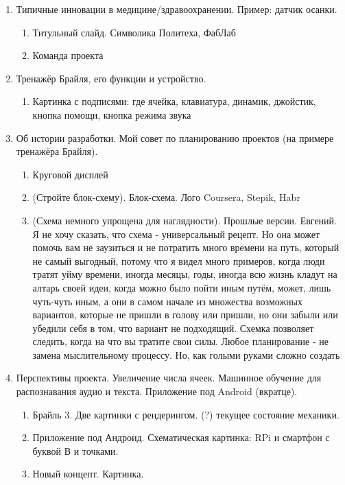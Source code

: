 \documentclass[a4paper,12pt]{article} %
\begin{document}
\begin{enumerate}
	
	\item{} Типичные инновации в медицине/здравоохранении. Пример: датчик осанки.
	\begin{enumerate}
		\item Титульный слайд. Символика Политеха, ФабЛаб
		\item Команда проекта
	\end{enumerate}

	\item{} Тренажёр Брайля, его функции и устройство.
	\begin{enumerate}
		\item Картинка с подписями: где ячейка, клавиатура, динамик, джойстик, кнопка помощи, кнопка режима звука
	\end{enumerate}
	
	\item{} Об истории разработки. Мой совет по планированию проектов (на примере тренажёра Брайля).
	\begin{enumerate}
		\item Круговой дисплей
		\item (Стройте блок-схему). Блок-схема. Лого Coursera, Stepik, Habr
		\item (Схема немного упрощена для наглядности). Прошлые версии. Евгений. Я не хочу сказать, что схема - универсальный рецепт. Но она может помочь вам не заузиться и не потратить много времени на путь, который не самый выгодный, потому что я видел много примеров, когда люди тратят уйму времени, иногда месяцы, годы, иногда всю жизнь кладут на алтарь своей идеи, когда можно было пойти иным путём, может, лишь чуть-чуть иным, а они в самом начале из множества возможных вариантов, которые не пришли в голову или пришли, но они забыли или убедили себя в том, что вариант не подходящий.
		Схемка позволяет следить, когда на что вы тратите свои силы. Любое планирование - не замена мыслительному процессу. Но, как голыми руками сложно создать 
	\end{enumerate}
	\item{} Перспективы проекта. Увеличение числа ячеек. Машинное обучение для распознавания аудио и текста. Приложение под Android (вкратце).
	\begin{enumerate}
		\item Брайль 3. Две картинки с рендерингом. (?) текущее состояние механики.
		\item Приложение под Андроид. Схематическая картинка: RPi и смартфон с буквой В и точками.
		\item Новый концепт. Картинка.
	\end{enumerate}
	

\end{enumerate}
\end{document}
